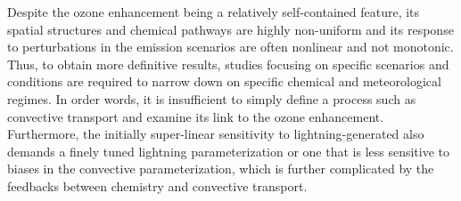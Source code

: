 \vspace{1in}

\noindent Despite the ozone enhancement being a relatively self-contained feature, its spatial structures
and chemical pathways are highly non-uniform and its response to perturbations in the emission
scenarios are often nonlinear and not monotonic. Thus, to obtain more definitive results, studies
focusing on specific scenarios and conditions are required to narrow down on specific chemical
and meteorological regimes. In order words, it is insufficient to simply define a process such as
convective transport and examine its link to the ozone enhancement. Furthermore, the initially
super-linear sensitivity to lightning-generated  also demands a finely tuned lightning
parameterization or one that is less sensitive to biases in the convective parameterization, which
is further complicated by the feedbacks between chemistry and convective transport.